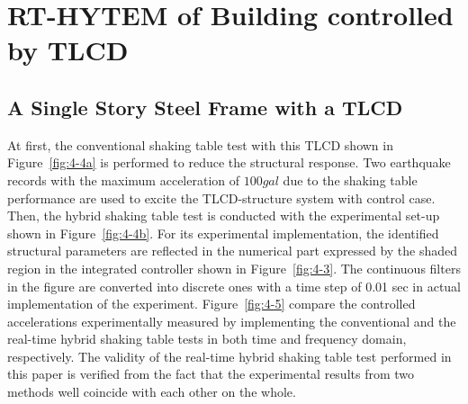 
\section{RT-HYTEM of Building controlled by TLCD}
\subsection{A Single Story Steel Frame with a TLCD}
At first, the conventional shaking table test with this TLCD shown in Figure~\ref{fig:4-4a} is performed to reduce the structural response. Two earthquake records with the maximum acceleration of $100gal$ due to the shaking table performance are used to excite the TLCD-structure system with control case. Then, the hybrid shaking table test is conducted with the experimental set-up shown in Figure~\ref{fig:4-4b}. For its experimental implementation, the identified structural parameters are reflected in the numerical part expressed by the shaded region in the integrated controller shown in Figure~\ref{fig:4-3}. The continuous filters in the figure are converted into discrete ones with a time step of 0.01 sec in actual implementation of the experiment. Figure~\ref{fig:4-5} compare the controlled accelerations experimentally measured by implementing the conventional and the real-time hybrid shaking table tests in both time and frequency domain, respectively. The validity of the real-time hybrid shaking table test performed in this paper is verified from the fact that the experimental results from two methods well coincide with each other on the whole.

